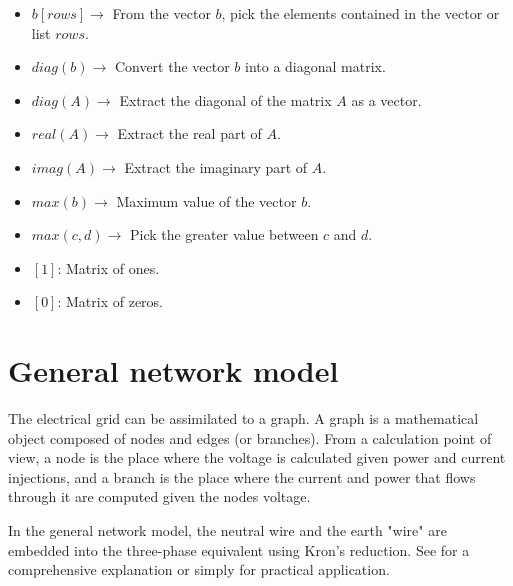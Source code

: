 \documentclass[a4paper,twoside,fleqn]{tufte-book}
\begin{document}
\begin{fullwidth}
\begin{multicols}{2}
\begin{itemize}
	
	\item $b[rows] \rightarrow$ From the vector $b$, pick the elements contained in the vector or list $rows$.
	
	\item $diag(b) \rightarrow$ Convert the vector $b$ into a diagonal matrix. 
	
	\item $diag(A) \rightarrow$ Extract the diagonal of the matrix $A$ as a vector. 
	
	\item $real(A) \rightarrow$ Extract the real part of $A$.
	
	\item $imag(A) \rightarrow$ Extract the imaginary part of $A$.
	
	\item $max(b) \rightarrow$ Maximum value of the vector $b$.
	
	\item $max(c, d) \rightarrow$ Pick the greater value between $c$ and $d$.
	
	\item $[1]$: Matrix of ones.

	\item $[0]$: Matrix of zeros.
\end{itemize}

\end{multicols}

\end{fullwidth}

\chapter{General network model}

The electrical grid can be assimilated to a graph. A graph is a mathematical object composed of nodes and edges (or branches). From a calculation point of view, a node is the place where the voltage is calculated given power and current injections, and a branch is the place where the current and power that flows through it are computed given the nodes voltage.

In the general network model, the neutral wire and the earth "wire" are embedded into the three-phase equivalent using Kron's reduction. See \cite{dorfler2013kron} for a comprehensive explanation or simply \cite{kersting2012distribution} for practical application.
\end{document}
